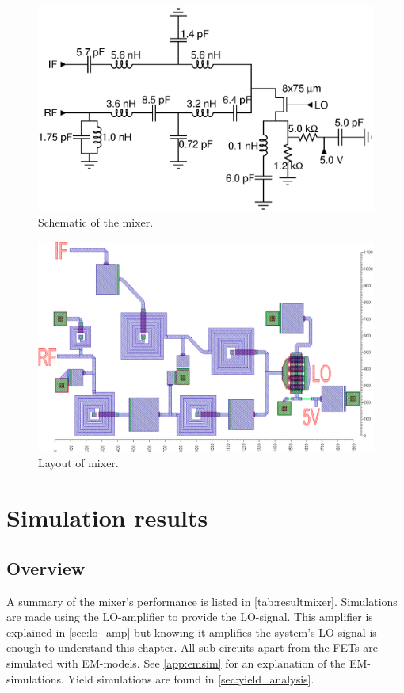 		\begin{figure}[hbt!]
			\centering
			\includegraphics[width=1.0\textwidth]{fig/mixer/sch_mixer}
			\caption[Mixer schematic.]{Schematic of the mixer.}\label{fig:mixerschematic}
		\end{figure}

		\begin{figure}[hbt!]
			\centering
			\includegraphics[width=1.0\textwidth]{fig/mixer/layout}
			\caption[Mixer layout.]{Layout of mixer.\scalemum}\label{fig:mixerlayout}
		\end{figure}

	\section{Simulation results}\label{sec:mixer}
		\subsection{Overview}
			A summary of the mixer's performance is listed in \autoref{tab:resultmixer}. Simulations are made using the LO-amplifier to provide the LO-signal. This amplifier is explained in \autoref{sec:lo_amp} but knowing it amplifies the system's LO-signal is enough to understand this chapter. All sub-circuits apart from the FETs are simulated with EM-models. See \autoref{app:emsim} for an explanation of the EM-simulations. Yield simulations are found in \autoref{sec:yield_analysis}.

